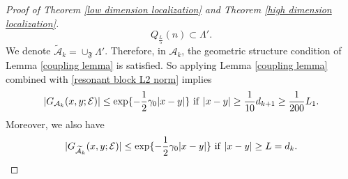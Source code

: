 \documentclass[11pt,reqno,UTF8,twoside]{amsart}
\newcommand{\mcA}{\mathcal{A}}
\newcommand{\mcE}{\mathcal{E}}
\theoremstyle{definition}
\numberwithin{equation}{section}
\begin{document}
\begin{proof}[Proof of Theorem \ref{low dimension localization} and Theorem \ref{high dimension localization}]
\[Q_{\frac{L}{5}}(n)\subset \Lambda'.\]
We denote $\widetilde{\mcA}_k=\cup_{\mathfrak{F}}\Lambda'$.
Therefore, in $\mcA_k$,  the geometric structure condition of   Lemma \ref{coupling lemma} is satisfied. So applying  Lemma \ref{coupling lemma} combined with  \eqref{resonant block L2 norm} implies %
\begin{equation}\label{good annuls off diagonal decay}
        |G_{\mcA_k}(x,y;\mcE) | \leq \exp\{-\frac{1}{2}\gamma_0 |x-y|\} \ {\rm if} \ |x-y|\geq \frac{1}{10} d_{k+1} \geq \frac{1}{200} L_1.
\end{equation}
Moreover, we also have 
\begin{equation}\label{good covering off diagonal decay}
        |G_{\widetilde{\mcA}_k}(x,y;\mcE) | \leq \exp\{-\frac{1}{2}\gamma_0 |x-y| \} \ {\rm if} \ |x-y|\geq  L = d_k.
\end{equation}



\end{proof}
\end{document}
